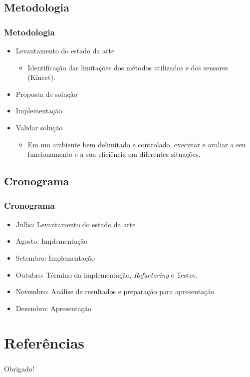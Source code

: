 \documentclass{beamer}
\begin{document}
\subsection{Metodologia}
\begin{frame}
    \frametitle{Metodologia}
    \begin{itemize}
    \pause \item Levantamento do estado da arte
        \begin{itemize}
            \item Identificação das limitações dos métodos utilizados e dos sensores (Kinect).
        \end{itemize}
    \pause \item Proposta de solução
    \pause \item Implementação.
    \pause \item Validar solução
        \begin{itemize}
            \item Em um ambiente bem delimitado e controlado, executar e avaliar a seu funcionamento e a sua eficiência em diferentes situações.
        \end{itemize}
    \end{itemize}
\end{frame}


\subsection{Cronograma}
\begin{frame}
    \frametitle{Cronograma}
    \begin{itemize}
        \item Julho: Levantamento do estado da arte
        \item Agosto: Implementação
        \item Setembro: Implementação
        \item Outubro: Término da implementação, \textit{Refactoring} e Testes.
        \item Novembro: Análise de resultados e preparação para apresentação
        \item Dezembro: Apresentação
    \end{itemize}
\end{frame}



\nocite{fabriciobuzzeto,weiser2,saocarlos,yang,hewitt,violajones}

\section{Referências}


\begin{frame}
    \frametitle{ }
    \centerline{Obrigado!}
\end{frame}
\end{document}
